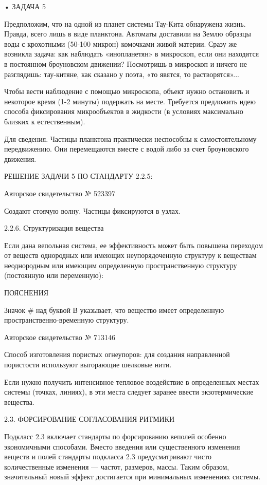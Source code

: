 • ЗАДАЧА 5

Предположим, что на одной из планет системы Тау-Кита обнаружена жизнь.
Правда,  всего лишь  в  виде планктона.  Автоматы  доставили на  Землю
образцы  воды с  крохотными (50-100  микрон) комочками  живой материи.
Сразу  же возникла  задача: как  наблюдать «инопланетян»  в микроскоп,
если  они находятся  в постоянном  броуновском движении?  Посмотришь в
микроскоп и ничего не разглядишь: тау-китяне, как сказано у поэта, «то
явятся, то растворятся»...

Чтобы вести наблюдение с помощью микроскопа, объект нужно остановить и
некоторое время (1-2 минуты)  подержать на месте. Требуется предложить
идею  способа  фиксирования  микрообъектов   в  жидкости  (в  условиях
максимально близких к естественным).

Для   сведения.    Частицы   планктона   практически    неспособны   к
самостоятельному передвижению. Они перемещаются вместе с водой либо за
счет броуновского движения.


РЕШЕНИЕ ЗАДАЧИ 5 ПО СТАНДАРТУ 2.2.5:


Авторское свидетельство № 523397

Создают стоячую волну. Частицы фиксируются в узлах.

2.2.6. Структуризация вещества

Если  дана вепольная  система,  ее эффективность  может быть  повышена
переходом от веществ однородных  или имеющих неупорядоченную структуру
к  веществам неоднородным  или  имеющим определенную  пространственную
структуру (постоянную или переменную):


ПОЯСНЕНИЯ

Значок  \# над  буквой В  указывает, что  вещество имеет  определенную
пространственно-временную структуру.


Авторское свидетельство № 713146

Способ  изготовления пористых  огнеупоров:  для создания  направленной
пористости используют выгорающие шелковые нити.

Если нужно  получить интенсивное  тепловое воздействие  в определенных
местах системы  (точках, линиях), в  эти места следует  заранее ввести
экзотермические вещества.


2.3. ФОРСИРОВАНИЕ СОГЛАСОВАНИЯ РИТМИКИ

Подкласс  2.3  включает  стандарты по  форсированию  веполей  особенно
экономичными  способами. Вместо  введения или  существенного изменения
веществ  и   полей  стандарты  подкласса  2.3   предусматривают  чисто
количественные  изменения —  частот, размеров,  массы. Таким  образом,
значительный  новый  эффект  достигается  при  минимальных  изменениях
системы.


